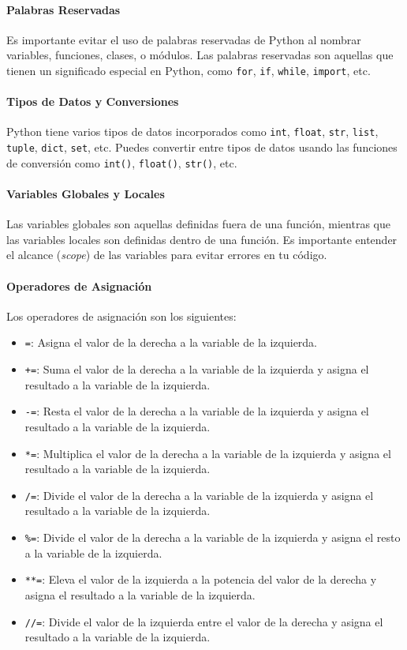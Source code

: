 \documentclass[executivepaper]{article}
\begin{document}
\paragraph{Palabras Reservadas}
Es importante evitar el uso de palabras reservadas de Python al nombrar variables, funciones, clases, o módulos. Las palabras reservadas son aquellas que tienen un significado especial en Python, como \lstinline{for}, \lstinline{if}, \lstinline{while}, \lstinline{import}, etc.

\paragraph{Tipos de Datos y Conversiones}
Python tiene varios tipos de datos incorporados como \lstinline{int}, \lstinline{float}, \lstinline{str}, \lstinline{list}, \lstinline{tuple}, \lstinline{dict}, \lstinline{set}, etc. Puedes convertir entre tipos de datos usando las funciones de conversión como \lstinline{int()}, \lstinline{float()}, \lstinline{str()}, etc.

\paragraph{Variables Globales y Locales}
Las variables globales son aquellas definidas fuera de una función, mientras que las variables locales son definidas dentro de una función. Es importante entender el alcance (\emph{scope}) de las variables para evitar errores en tu código.

\paragraph{Operadores de Asignación}
Los operadores de asignación son los siguientes:
\begin{itemize}
    \item \lstinline{=}: Asigna el valor de la derecha a la variable de la izquierda.
    \item \lstinline{+=}: Suma el valor de la derecha a la variable de la izquierda y asigna el resultado a la variable de la izquierda.
    \item \lstinline{-=}: Resta el valor de la derecha a la variable de la izquierda y asigna el resultado a la variable de la izquierda.
    \item \lstinline{*=}: Multiplica el valor de la derecha a la variable de la izquierda y asigna el resultado a la variable de la izquierda.
    \item \lstinline{/=}: Divide el valor de la derecha a la variable de la izquierda y asigna el resultado a la variable de la izquierda.
    \item \lstinline{%=}: Divide el valor de la derecha a la variable de la izquierda y asigna el resto a la variable de la izquierda.
    \item \lstinline{**=}: Eleva el valor de la izquierda a la potencia del valor de la derecha y asigna el resultado a la variable de la izquierda.
    \item \lstinline{//=}: Divide el valor de la izquierda entre el valor de la derecha y asigna el resultado a la variable de la izquierda.
\end{itemize}
\end{document}

